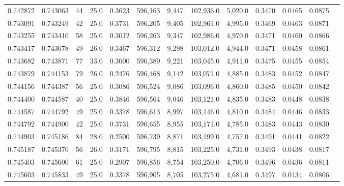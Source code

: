 \begin{tabular}{rrrrrrrrrrrrr}
0.742872 & 0.743063 &    44 & 25.0 &                                     0.3623 & 596,163 &   9,447 & 102,936.0 &   5,020.0 & 0.3470 & 0.0465 & 0.0875 \\
0.743091 & 0.743249 &    42 & 25.0 &                                     0.3731 & 596,205 &   9,405 & 102,961.0 &   4,995.0 & 0.3469 & 0.0463 & 0.0871 \\
0.743255 & 0.743410 &    58 & 25.0 &                                     0.3012 & 596,263 &   9,347 & 102,986.0 &   4,970.0 & 0.3471 & 0.0460 & 0.0866 \\
0.743417 & 0.743678 &    49 & 26.0 &                                     0.3467 & 596,312 &   9,298 & 103,012.0 &   4,944.0 & 0.3471 & 0.0458 & 0.0861 \\
0.743682 & 0.743871 &    77 & 33.0 &                                     0.3000 & 596,389 &   9,221 & 103,045.0 &   4,911.0 & 0.3475 & 0.0455 & 0.0854 \\
0.743879 & 0.744153 &    79 & 26.0 &                                     0.2476 & 596,468 &   9,142 & 103,071.0 &   4,885.0 & 0.3483 & 0.0452 & 0.0847 \\
0.744156 & 0.744387 &    56 & 25.0 &                                     0.3086 & 596,524 &   9,086 & 103,096.0 &   4,860.0 & 0.3485 & 0.0450 & 0.0842 \\
0.744400 & 0.744587 &    40 & 25.0 &                                     0.3846 & 596,564 &   9,046 & 103,121.0 &   4,835.0 & 0.3483 & 0.0448 & 0.0838 \\
0.744587 & 0.744792 &    49 & 25.0 &                                     0.3378 & 596,613 &   8,997 & 103,146.0 &   4,810.0 & 0.3484 & 0.0446 & 0.0833 \\
0.744792 & 0.744900 &    42 & 25.0 &                                     0.3731 & 596,655 &   8,955 & 103,171.0 &   4,785.0 & 0.3483 & 0.0443 & 0.0830 \\
0.744903 & 0.745186 &    84 & 28.0 &                                     0.2500 & 596,739 &   8,871 & 103,199.0 &   4,757.0 & 0.3491 & 0.0441 & 0.0822 \\
0.745187 & 0.745370 &    56 & 26.0 &                                     0.3171 & 596,795 &   8,815 & 103,225.0 &   4,731.0 & 0.3493 & 0.0438 & 0.0817 \\
0.745403 & 0.745600 &    61 & 25.0 &                                     0.2907 & 596,856 &   8,754 & 103,250.0 &   4,706.0 & 0.3496 & 0.0436 & 0.0811 \\
0.745603 & 0.745833 &    49 & 25.0 &                                     0.3378 & 596,905 &   8,705 & 103,275.0 &   4,681.0 & 0.3497 & 0.0434 & 0.0806 \\

\end{tabular}
